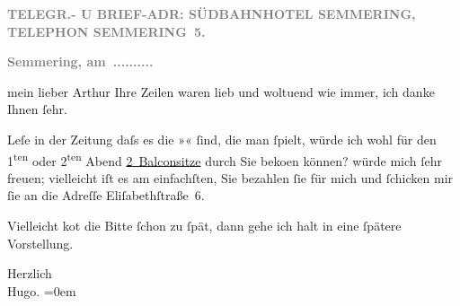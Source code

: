 \pstart
           \centering{}\textcolor{gray}{\textbf{TELEGR.- U BRIEF-ADR: SÜDBAHNHOTEL SEMMERING, TELEPHON SEMMERING 5.}}\pend
           
\pstart
           \raggedleft{}\textcolor{gray}{\textbf{Semmering, am ..........}}\pend
           
\pstart{}mein lieber Arthur \pend\vspace{0.5em}
\pstart
           Ihre Zeilen waren lieb und woltuend wie immer, ich danke Ihnen ſehr.\pend
           
\pstart
           Leſe in der Zeitung daſs es die »\label{K_L02053-1v}\label{K_L02053-1}« ſind, die man ſpielt, würde ich wohl für den 1\textsuperscript{ten}{ }{\pb}oder 2\textsuperscript{ten} Abend \uline{2 Balconsitze} durch Sie beko{\geminationm}en können? würde mich ſehr freuen; vielleicht iſt es am
               einfachſten, Sie bezahlen ſie für mich und ſchicken mir ſie an die Adreſſe Eliſabethſtraße 6.\pend
           
\pstart
           Vielleicht ko{\geminationm}t die Bitte ſchon zu ſpät, dann gehe ich
               halt in eine ſpätere Vorstellung.\pend
           
\pstart
           Herzlich{\\[\baselineskip]}\spacefill\mbox{Hugo.}\pend
           \leftskip=0em{}\endnumbering{}  
      